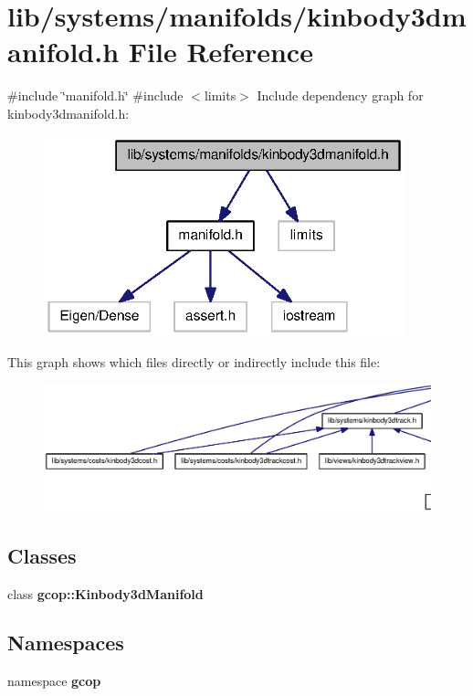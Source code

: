 \section{lib/systems/manifolds/kinbody3dmanifold.h \-File \-Reference}
\label{kinbody3dmanifold_8h}
{\ttfamily \#include \char`\"{}manifold.\-h\char`\"{}}\*
{\ttfamily \#include $<$limits$>$}\*
\-Include dependency graph for kinbody3dmanifold.\-h\-:
\nopagebreak
\begin{figure}[H]
\begin{center}
\leavevmode
\includegraphics[width=296pt]{kinbody3dmanifold_8h__incl}
\end{center}
\end{figure}
\-This graph shows which files directly or indirectly include this file\-:
\nopagebreak
\begin{figure}[H]
\begin{center}
\leavevmode
\includegraphics[width=350pt]{kinbody3dmanifold_8h__dep__incl}
\end{center}
\end{figure}
\subsection*{\-Classes}
\begin{DoxyCompactItemize}
\item 
class {\bf gcop\-::\-Kinbody3d\-Manifold}
\end{DoxyCompactItemize}
\subsection*{\-Namespaces}
\begin{DoxyCompactItemize}
\item 
namespace {\bf gcop}
\end{DoxyCompactItemize}
